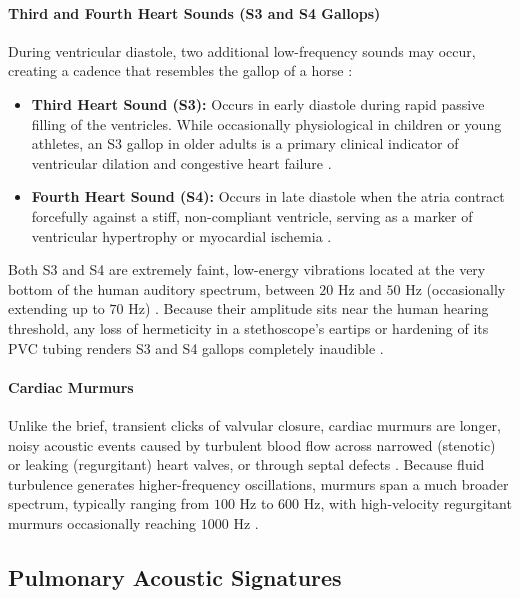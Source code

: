 \paragraph{Third and Fourth Heart Sounds (S3 and S4 Gallops)}
During ventricular diastole, two additional low-frequency sounds may occur, creating a cadence that resembles the gallop of a horse \cite{leng2015electronic}:
\begin{itemize}
    \item \textbf{Third Heart Sound (S3):} Occurs in early diastole during rapid passive filling of the ventricles. While occasionally physiological in children or young athletes, an S3 gallop in older adults is a primary clinical indicator of ventricular dilation and congestive heart failure \cite{leng2015electronic, webster2010medical}.
    \item \textbf{Fourth Heart Sound (S4):} Occurs in late diastole when the atria contract forcefully against a stiff, non-compliant ventricle, serving as a marker of ventricular hypertrophy or myocardial ischemia \cite{leng2015electronic}.
\end{itemize}
Both S3 and S4 are extremely faint, low-energy vibrations located at the very bottom of the human auditory spectrum, between $20\text{ Hz}$ and $50\text{ Hz}$ (occasionally extending up to $70\text{ Hz}$) \cite{ertel1966stethoscope, leng2015electronic}. Because their amplitude sits near the human hearing threshold, any loss of hermeticity in a stethoscope's eartips or hardening of its PVC tubing renders S3 and S4 gallops completely inaudible \cite{ertel1966stethoscope}.

\paragraph{Cardiac Murmurs}
Unlike the brief, transient clicks of valvular closure, cardiac murmurs are longer, noisy acoustic events caused by turbulent blood flow across narrowed (stenotic) or leaking (regurgitant) heart valves, or through septal defects \cite{leng2015electronic, webster2010medical}. Because fluid turbulence generates higher-frequency oscillations, murmurs span a much broader spectrum, typically ranging from $100\text{ Hz}$ to $600\text{ Hz}$, with high-velocity regurgitant murmurs occasionally reaching $1000\text{ Hz}$ \cite{leng2015electronic}.

\subsection{Pulmonary Acoustic Signatures}

